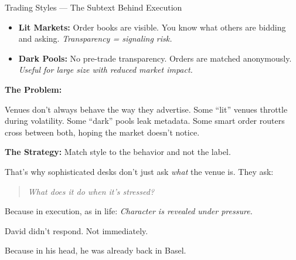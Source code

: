 \begin{TechnicalSidebar}{Trading Styles — The Subtext Behind Execution}
    \medskip
    
    
    \begin{itemize}
      \item \textbf{Lit Markets:} Order books are visible. You know what others are bidding and asking.  
      \textit{Transparency = signaling risk.}
    
      \item \textbf{Dark Pools:} No pre-trade transparency. Orders are matched anonymously.  
      \textit{Useful for large size with reduced market impact.}
    \end{itemize}
    
    \medskip
    
    \textbf{The Problem:}  

    Venues don’t always behave the way they advertise.  
    Some “lit” venues throttle during volatility.  
    Some “dark” pools leak metadata.  
    Some smart order routers cross between both, hoping the market doesn’t notice.
    
    \medskip
    
    \textbf{The Strategy:}  
    Match style to the behavior and not the label.

    \medskip
    
    
    That’s why sophisticated desks don’t just ask \textit{what} the venue is.  
    They ask:  

    \begin{quote}
      \textit{What does it do when it’s stressed?}
    \end{quote}
    
    Because in execution, as in life:  
    \textit{Character is revealed under pressure.}
    
\end{TechnicalSidebar}

\medskip

David didn’t respond. Not immediately.

Because in his head, he was already back in Basel.

\medskip

